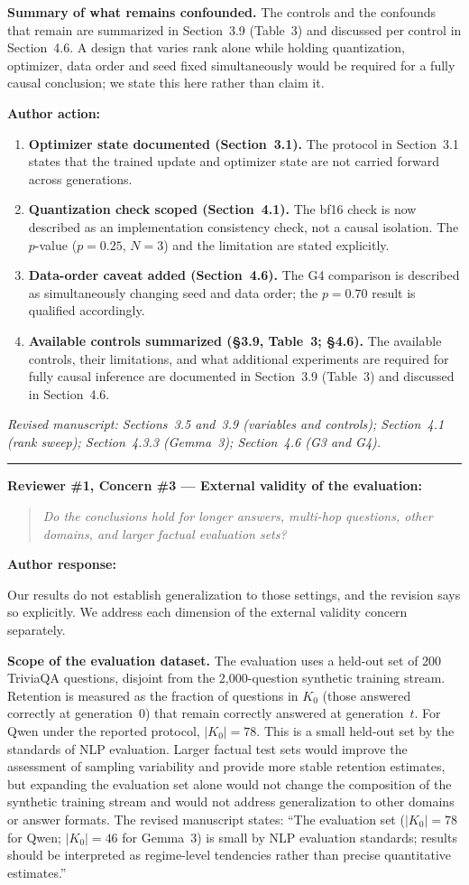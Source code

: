 \documentclass[11pt,a4paper]{article}
\newcommand{\rconcern}[3]{%
  \bigskip\noindent\rule{\linewidth}{0.4pt}\par\medskip
  \noindent\textbf{\textcolor{rccolor}{#1 --- #2:}}\par
  \smallskip
  \begin{quote}\itshape\textcolor{rccolor}{#3}\end{quote}%
}
\newcommand{\arhead}[1]{\medskip\noindent\textbf{#1}\par\smallskip}
\newcommand{\newtext}[1]{\textcolor{chgcolor}{``#1''}}
\newcommand{\msloc}[1]{%
  \smallskip\noindent\textit{Revised manuscript: #1}\par%
}
\begin{document}
\textbf{Summary of what remains confounded.}
The controls and the confounds that remain are summarized in Section~3.9
(Table~3) and discussed per control in Section~4.6. A design that varies
rank alone while holding quantization, optimizer, data order and seed fixed
simultaneously would be required for a fully causal conclusion; we state
this here rather than claim it.

\arhead{Author action:}
\begin{enumerate}[leftmargin=1.4em,itemsep=0.3em]
\item \textbf{Optimizer state documented (Section~3.1).}
      The protocol in Section~3.1 states that the trained update and optimizer state are not carried forward across generations.
\item \textbf{Quantization check scoped (Section~4.1).}
      The bf16 check is now described as an implementation consistency
      check, not a causal isolation. The $p$-value ($p=0.25$, $N=3$)
      and the limitation are stated explicitly.
\item \textbf{Data-order caveat added (Section~4.6).}
      The G4 comparison is described as simultaneously changing seed
      and data order; the $p=0.70$ result is qualified accordingly.
\item \textbf{Available controls summarized (\S3.9, Table~3; \S4.6).}
      The available controls, their limitations, and what additional
      experiments are required for fully causal inference are documented
      in Section~3.9 (Table~3) and discussed in Section~4.6.
\end{enumerate}

\msloc{Sections~3.5 and~3.9 (variables and controls); Section~4.1 (rank
sweep); Section~4.3.3 (Gemma~3);
Section~4.6 (G3 and G4).}

\rconcern{Reviewer \#1, Concern \#3}{External validity of the evaluation}{Do the conclusions hold for longer answers, multi-hop questions, other domains, and larger factual evaluation sets?}

\arhead{Author response:}

Our results do not establish generalization to those settings, and the
revision says so explicitly. We address each dimension of the external
validity concern separately.

\textbf{Scope of the evaluation dataset.}
The evaluation uses a held-out set of 200 TriviaQA questions, disjoint
from the 2,000-question synthetic training stream. Retention is measured
as the fraction of questions in $K_0$ (those answered correctly at
generation~0) that remain correctly answered at generation~$t$. For Qwen
under the reported protocol, $|K_0|=78$. This is a small held-out set by
the standards of NLP evaluation. Larger factual test sets would improve
the assessment of sampling variability and provide more stable retention
estimates, but expanding the evaluation set alone would not change the
composition of the synthetic training stream and would not address
generalization to other domains or answer formats. The revised manuscript
states: \newtext{The evaluation set ($|K_0|=78$ for Qwen; $|K_0|=46$
for Gemma~3) is small by NLP evaluation standards; results should be
interpreted as regime-level tendencies rather than precise quantitative
estimates.}
\end{document}
